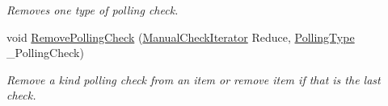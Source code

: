 \begin{DoxyCompactItemize}
\begin{DoxyCompactList}\small\item\em Removes one type of polling check. \item\end{DoxyCompactList}\item 
void \hyperlink{structphys_1_1internal_1_1EventManagerInternalData_ab5d884b9731f79069ae4bd890dd15748}{RemovePollingCheck} (\hyperlink{structphys_1_1internal_1_1EventManagerInternalData_ad2b9c7924f32e299846f1d945cb82dc0}{ManualCheckIterator} Reduce, \hyperlink{structphys_1_1internal_1_1EventManagerInternalData_ab9ab8380b84448aacf46a63050e159af}{PollingType} \_\-PollingCheck)
\begin{DoxyCompactList}\small\item\em Remove a kind polling check from an item or remove item if that is the last check. \item\end{DoxyCompactList}\end{DoxyCompactItemize}
